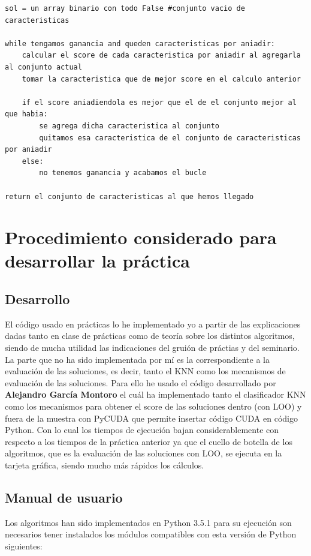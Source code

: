 \documentclass[10pt,a4paper]{article}
\begin{document}
\begin{lstlisting}
sol = un array binario con todo False #conjunto vacio de caracteristicas

while tengamos ganancia and queden caracteristicas por aniadir:
	calcular el score de cada caracteristica por aniadir al agregarla al conjunto actual
	tomar la caracteristica que de mejor score en el calculo anterior
	
	if el score aniadiendola es mejor que el de el conjunto mejor al que habia:
		se agrega dicha caracteristica al conjunto
		quitamos esa caracteristica de el conjunto de caracteristicas por aniadir
	else:
		no tenemos ganancia y acabamos el bucle
		
return el conjunto de caracteristicas al que hemos llegado
\end{lstlisting}
\newpage

\section{\color[rgb]{0.0,0.0,0.21}Procedimiento considerado para desarrollar la práctica}

\subsection{\color[rgb]{0.0,0.0,0.51}Desarrollo}

El código usado en prácticas lo he implementado yo a partir de las explicaciones dadas tanto en clase de prácticas como de teoría sobre los distintos algoritmos, siendo de mucha utilidad las indicaciones del gruión de práctias y del seminario.\\

La parte que no ha sido implementada por mí es la correspondiente a la evaluación de las soluciones, es decir, tanto el KNN como los mecanismos de evaluación de las soluciones. Para ello he usado el código desarrollado por \textbf{Alejandro García Montoro} el cuál ha implementado tanto el clasificador KNN como los mecanismos para obtener el score de las soluciones dentro (con LOO) y fuera de la muestra con PyCUDA que permite insertar código CUDA en código Python. Con lo cual los tiempos de ejecución bajan considerablemente con respecto a los tiempos de la práctica anterior ya que el cuello de botella de los algoritmos, que es la evaluación de las soluciones con LOO, se ejecuta en la tarjeta gráfica, siendo mucho más rápidos los cálculos.\\

\subsection{\color[rgb]{0.0,0.0,0.51}Manual de usuario}
Los algoritmos han sido implementados en Python 3.5.1 para su ejecución son necesarios tener instalados los módulos compatibles con esta versión de Python siguientes:\\
\end{document}
